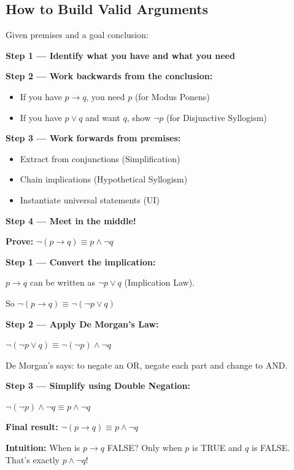 \documentclass[11pt,a4paper]{article}
\begin{document}
\subsection{How to Build Valid Arguments}

\begin{tipbox}
Given premises and a goal conclusion:

\textbf{Step 1 --- Identify what you have and what you need}

\textbf{Step 2 --- Work backwards from the conclusion:}
\begin{itemize}[noitemsep]
    \item If you have $p \to q$, you need $p$ (for Modus Ponens)
    \item If you have $p \lor q$ and want $q$, show $\neg p$ (for Disjunctive Syllogism)
\end{itemize}

\textbf{Step 3 --- Work forwards from premises:}
\begin{itemize}[noitemsep]
    \item Extract from conjunctions (Simplification)
    \item Chain implications (Hypothetical Syllogism)
    \item Instantiate universal statements (UI)
\end{itemize}

\textbf{Step 4 --- Meet in the middle!}
\end{tipbox}

\begin{examplebox}
\textbf{Prove:} $\neg(p \to q) \equiv p \land \neg q$

\textbf{Step 1 --- Convert the implication:}

$p \to q$ can be written as $\neg p \lor q$ (Implication Law).

So $\neg(p \to q) \equiv \neg(\neg p \lor q)$

\textbf{Step 2 --- Apply De Morgan's Law:}

$\neg(\neg p \lor q) \equiv \neg(\neg p) \land \neg q$

De Morgan's says: to negate an OR, negate each part and change to AND.

\textbf{Step 3 --- Simplify using Double Negation:}

$\neg(\neg p) \land \neg q \equiv p \land \neg q$

\textbf{Final result:} $\neg(p \to q) \equiv p \land \neg q$ \checkmark

\textbf{Intuition:} When is $p \to q$ FALSE? Only when $p$ is TRUE and $q$ is FALSE. That's exactly $p \land \neg q$!
\end{examplebox}
\end{document}
